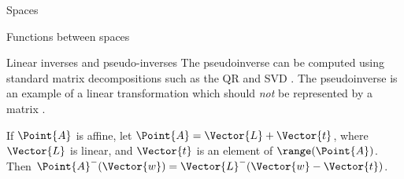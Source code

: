 \begin{plSection}{Spaces}
\begin{plSection}{Functions between spaces}
\begin{plSection}{Linear inverses and pseudo-inverses}
The pseudoinverse can be computed
using standard matrix decompositions such as
the QR and SVD .
The pseudoinverse is an example of a linear transformation
which should {\em not} be represented by a matrix
.

If $\Point{A}$ is affine,
let $\Point{A} = \Vector{L} + \Vector{t}$,
where $\Vector{L}$ is linear,
and $\Vector{t}$ is an element of $\range(\Point{A})$.
Then $\Point{A}^{-}(\Vector{w}) = \Vector{L}^{-}( \Vector{w} - \Vector{t} )$.
\end{plSection}%
\end{plSection}%
\end{plSection}%
